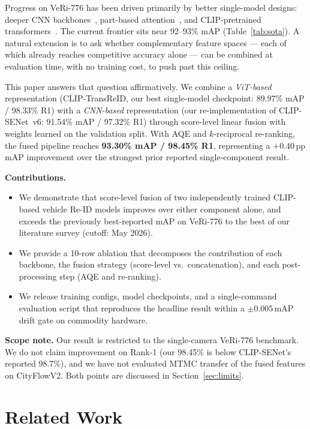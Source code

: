 \documentclass{ieeeaccess}
\newcommand{\ourmap}{93.30}
\newcommand{\ourrank}{98.45}
\newcommand{\trmap}{89.97}
\newcommand{\trrank}{98.33}
\newcommand{\csmap}{91.54}   %
\newcommand{\csrank}{97.32}
\begin{document}
Progress on VeRi-776 has been driven primarily by better single-model
designs: deeper CNN backbones~\cite{vehiclenet}, part-based
attention~\cite{hpgn,cal}, and CLIP-pretrained
transformers~\cite{transreid,clipreid,clipsenet}.
The current frontier sits near 92--93\% mAP (Table~\ref{tab:sota}).
A natural extension is to ask whether complementary feature spaces ---
each of which already reaches competitive accuracy alone ---
can be combined at evaluation time, with no training cost,
to push past this ceiling.

This paper answers that question affirmatively.
We combine a \emph{ViT-based} representation (CLIP-TransReID,
our best single-model checkpoint: \trmap\% mAP / \trrank\% R1)
with a \emph{CNN-based} representation (our re-implementation of
CLIP-SENet~v6: \csmap\% mAP / \csrank\% R1) through
score-level linear fusion with weights learned on the validation split.
With AQE and $k$-reciprocal re-ranking, the fused pipeline reaches
\textbf{\ourmap\% mAP / \ourrank\% R1}, representing a
$+\mathbf{0.40}$\,pp mAP improvement over the strongest prior reported
single-component result.

\textbf{Contributions.}
\begin{itemize}
  \item We demonstrate that score-level fusion of two independently
  trained CLIP-based vehicle Re-ID models improves over either component
  alone, and exceeds the previously best-reported mAP on VeRi-776
  to the best of our literature survey (cutoff: May 2026).
  \item We provide a 10-row ablation that decomposes the contribution of
  each backbone, the fusion strategy (score-level vs.\ concatenation),
  and each post-processing step (AQE and re-ranking).
  \item We release training configs, model checkpoints, and a
  single-command evaluation script that reproduces the headline result
  within a $\pm0.005$\,mAP drift gate on commodity hardware.
\end{itemize}

\textbf{Scope note.}
Our result is restricted to the single-camera VeRi-776 benchmark.
We do not claim improvement on Rank-1 (our \ourrank\% is below
CLIP-SENet's reported 98.7\%), and we have not evaluated MTMC transfer
of the fused features on CityFlowV2. Both points are discussed in
Section~\ref{sec:limits}.

\section{Related Work}
\label{sec:related}
\end{document}
